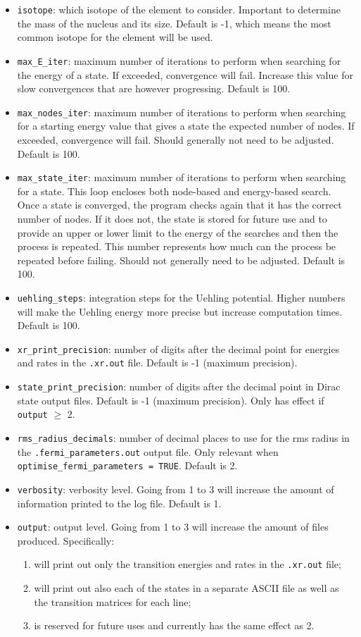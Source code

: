 \documentclass[]{article}
\begin{document}
\begin{itemize}
	\item \texttt{isotope}: which isotope of the element to consider. Important to determine the mass of the nucleus and its size. Default is -1, which means the most common isotope for the element will be used.
	\item \texttt{max\_E\_iter}: maximum number of iterations to perform when searching for the energy of a state. If exceeded, convergence will fail. Increase this value for slow convergences that are however progressing. Default is 100.
	\item \texttt{max\_nodes\_iter}: maximum number of iterations to perform when searching for a starting energy value that gives a state the expected number of nodes. If exceeded, convergence will fail. Should generally not need to be adjusted. Default is 100.
	\item \texttt{max\_state\_iter}: maximum number of iterations to perform when searching for a state. This loop encloses both node-based and energy-based search. Once a state is converged, the program checks again that it has the correct number of nodes. If it does not, the state is stored for future use and to provide an upper or lower limit to the energy of the searches and then the process is repeated. This number represents how much can the process be repeated before failing. Should not generally need to be adjusted. Default is 100.
	\item \texttt{uehling\_steps}: integration steps for the Uehling potential. Higher numbers will make the Uehling energy more precise but increase computation times. Default is 100.
	\item \texttt{xr\_print\_precision}: number of digits after the decimal point for energies and rates in the \texttt{.xr.out} file. Default is -1 (maximum precision).
	\item \texttt{state\_print\_precision}: number of digits after the decimal point in Dirac state output files. Default is -1 (maximum precision). Only has effect if \texttt{output} $\geq$ 2.
	\item \texttt{rms\_radius\_decimals}: number of decimal places to use for the rms radius in the \texttt{.fermi\_parameters.out} output file. Only relevant when \texttt{optimise\_fermi\_parameters = TRUE}. Default is 2.
	\item \texttt{verbosity}: verbosity level. Going from 1 to 3 will increase the amount of information printed to the log file. Default is 1.
	\item \texttt{output}: output level. Going from 1 to 3 will increase the amount of files produced. Specifically:
	\begin{enumerate}
		\item will print out only the transition energies and rates in the \texttt{.xr.out} file;
		\item will print out also each of the states in a separate ASCII file as well as the transition matrices for each line;
		\item is reserved for future uses and currently has the same effect as 2.
	\end{enumerate}
\end{itemize}
\end{document}
